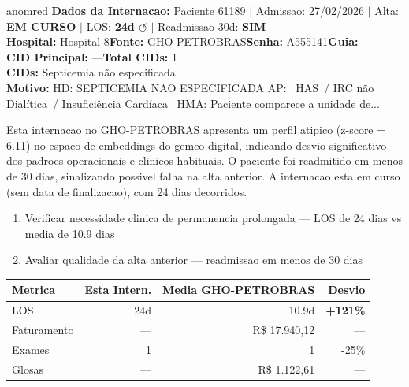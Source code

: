 \documentclass[a4paper,10pt]{article}
\begin{document}
\begin{anomalycard}[Internacao 167195 | GHO-PETROBRAS | CRITICO (z=6.11)]{anomred}
\textbf{Dados da Internacao:} Paciente 61189 $\mid$ Admissao: 27/02/2026 $\mid$ Alta: \textcolor{anomorange}{\textbf{EM CURSO}} $\mid$ LOS: \textbf{24d \textcolor{anomorange}{$\circlearrowleft$}} $\mid$ Readmissao 30d: \textcolor{anomred}{\textbf{SIM}}\\
\textbf{Hospital:} Hospital 8\quad\textbf{Fonte:} GHO-PETROBRAS\quad\textbf{Senha:} A555141\quad\textbf{Guia:} ---\\
\textbf{CID Principal:} {\small ---}\quad\textbf{Total CIDs:} 1\\

\textbf{CIDs:} {\scriptsize Septicemia não especificada}\\

\textbf{Motivo:} {\scriptsize HD: SEPTICEMIA NAO ESPECIFICADA  AP:  HAS / IRC não Dialítica / Insuficiência Cardíaca    HMA: Paciente comparece a unidade de...}\\

\vspace{2pt}\begin{tcolorbox}[colback=severityred!20,colframe=anomred,title={\textbf{Interpretacao de Negocio}},fonttitle=\bfseries\small,left=4pt,right=4pt,top=3pt,bottom=3pt]
{\small Esta internacao no GHO-PETROBRAS apresenta um perfil atipico (z-score = 6.11) no espaco de embeddings do gemeo digital, indicando desvio significativo dos padroes operacionais e clinicos habituais. O paciente foi readmitido em menos de 30 dias, sinalizando possivel falha na alta anterior. A internacao esta em curso (sem data de finalizacao), com 24 dias decorridos.}
\end{tcolorbox}
\begin{tcolorbox}[colback=severityyellow!30,colframe=anomorange,title={\textbf{Recomendacoes Especificas}},fonttitle=\bfseries\small,left=4pt,right=4pt,top=3pt,bottom=3pt]
\begin{enumerate}[nosep,leftmargin=16pt]
\item {\small Verificar necessidade clinica de permanencia prolongada --- LOS de 24 dias vs media de 10.9 dias}
\item {\small Avaliar qualidade da alta anterior --- readmissao em menos de 30 dias}
\end{enumerate}
\end{tcolorbox}
\begin{center}\begin{tabular}{l r r r}\toprule\textbf{Metrica} & \textbf{Esta Intern.} & \textbf{Media GHO-PETROBRAS} & \textbf{Desvio} \\\midrule
LOS & 24d & 10.9d & \textcolor{anomred}{\textbf{+121\%}} \\
Faturamento & --- & R\$ 17.940,12 & --- \\
Exames & 1 & 1 & -25\% \\
Glosas & --- & R\$ 1.122,61 & --- \\
\bottomrule\end{tabular}\end{center}


\end{anomalycard}
\end{document}

